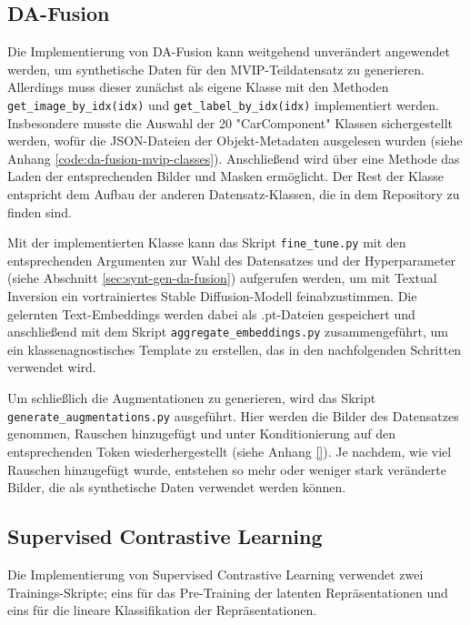 \subsection{DA-Fusion} \label{sec:impl-da-fusion}

Die Implementierung von DA-Fusion kann weitgehend unverändert angewendet werden, um synthetische Daten für den MVIP-Teildatensatz zu generieren. Allerdings muss dieser zunächst als eigene Klasse mit den Methoden \lstinline{get_image_by_idx(idx)} und \lstinline{get_label_by_idx(idx)} implementiert werden. Insbesondere musste die Auswahl der 20 "CarComponent" Klassen sichergestellt werden, wofür die JSON-Dateien der Objekt-Metadaten ausgelesen wurden (siehe Anhang \ref{code:da-fusion-mvip-classes}). Anschließend wird über eine Methode das Laden der entsprechenden Bilder und Masken ermöglicht. Der Rest der Klasse entspricht dem Aufbau der anderen Datensatz-Klassen, die in dem Repository zu finden sind.

Mit der implementierten Klasse kann das Skript \lstinline{fine_tune.py} mit den entsprechenden Argumenten zur Wahl des Datensatzes und der Hyperparameter (siehe Abschnitt \ref{sec:synt-gen-da-fusion}) aufgerufen werden, um mit Textual Inversion ein vortrainiertes Stable Diffusion-Modell feinabzustimmen. Die gelernten Text-Embeddings werden dabei als .pt-Dateien gespeichert und anschließend mit dem Skript \lstinline{aggregate_embeddings.py} zusammengeführt, um ein klassenagnostisches Template zu erstellen, das in den nachfolgenden Schritten verwendet wird.

Um schließlich die Augmentationen zu generieren, wird das Skript \lstinline{generate_augmentations.py} ausgeführt. Hier werden die Bilder des Datensatzes genommen, Rauschen hinzugefügt und unter Konditionierung auf den entsprechenden Token wiederhergestellt (siehe Anhang \ref{}). Je nachdem, wie viel Rauschen hinzugefügt wurde, entstehen so mehr oder weniger stark veränderte Bilder, die als synthetische Daten verwendet werden können.

\subsection{Supervised Contrastive Learning} \label{sec:impl-supcon}

Die Implementierung von Supervised Contrastive Learning verwendet zwei Trainings-Skripte; eins für das Pre-Training der latenten Repräsentationen und eins für die lineare Klassifikation der Repräsentationen.

